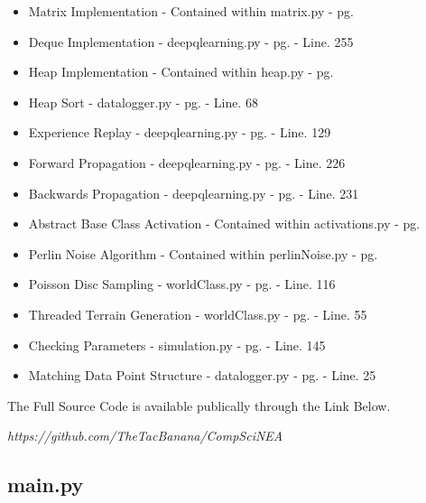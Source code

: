 \begin{flushleft}
        \begin{itemize}
            \item Matrix Implementation - Contained within matrix.py - pg. \pageref{sec:matrix.py}
            \item Deque Implementation - deepqlearning.py - pg.\pageref{sec:deepqlearning.py} - Line. 255
            \item Heap Implementation - Contained within heap.py - pg. \pageref{sec:heap.py}
            \item Heap Sort - datalogger.py - pg. \pageref{sec:datalogger.py} - Line. 68
            \item Experience Replay - deepqlearning.py - pg. \pageref{sec:deepqlearning.py} - Line. 129
            \item Forward Propagation - deepqlearning.py - pg. \pageref{sec:deepqlearning.py} - Line. 226
            \item Backwards Propagation - deepqlearning.py - pg. \pageref{sec:deepqlearning.py} - Line. 231
            \item Abstract Base Class Activation - Contained within activations.py - pg. \pageref{sec:activations.py}
            \item Perlin Noise Algorithm - Contained within perlinNoise.py - pg. \pageref{sec:perlinNoise.py}
            \item Poisson Disc Sampling - worldClass.py - pg. \pageref{sec:worldClass.py} - Line. 116
            \item Threaded Terrain Generation - worldClass.py - pg. \pageref{sec:worldClass.py} - Line. 55
            \item Checking Parameters - simulation.py - pg. \pageref{sec:simulation.py} - Line. 145
            \item Matching Data Point Structure - datalogger.py - pg. \pageref{sec:datalogger.py} - Line. 25
        \end{itemize}

        The Full Source Code is available publically through the Link Below. \\
        \vspace{0.5cm}
        \centerline{\textit{https://github.com/TheTacBanana/CompSciNEA}}

        \label{sec:main.py}
        \subsection{main.py}
        \inputminted[frame=leftline,framesep=2mm,baselinestretch=1.2,fontsize=\normalsize,linenos,breaklines]{python}{../Scripts/main.py}


\end{flushleft}
